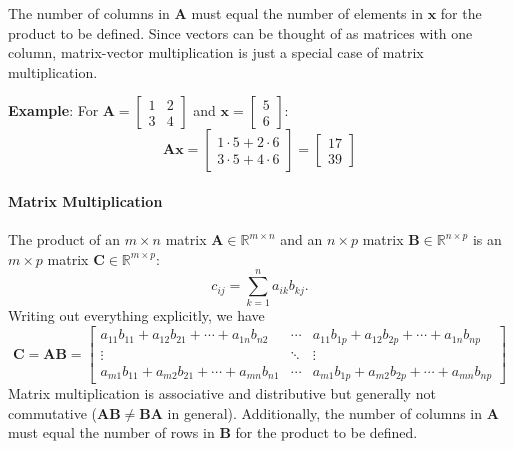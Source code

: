 The number of columns in $ \mathbf{A} $ must equal the number of elements in $ \mathbf{x} $ for the product to be defined. Since vectors can be thought of as matrices with one column, matrix-vector multiplication is just a special case of matrix multiplication.

\begin{exampleBox}
  \textbf{Example}: For $ \mathbf{A} = \begin{bmatrix}1 & 2\\3 & 4\end{bmatrix} $ and $ \mathbf{x} = \begin{bmatrix}5 \\ 6\end{bmatrix} $:
  \begin{equation*}
    \mathbf{A}\mathbf{x} = \begin{bmatrix}1 \cdot 5 + 2 \cdot 6 \\ 3 \cdot 5 + 4 \cdot 6\end{bmatrix} = \begin{bmatrix}17 \\ 39\end{bmatrix}
  \end{equation*}
\end{exampleBox}


\paragraph*{Matrix Multiplication}
The product of an $ m \times n $ matrix $ \mathbf{A}\in\mathbb{R}^{m\times n} $ and an $ n \times p $ matrix $ \mathbf{B} \in\mathbb{R}^{n\times p}$ is an $ m \times p $ matrix $ \mathbf{C} \in\mathbb{R}^{m\times p}$:
\begin{equation*}
  c_{ij} = \sum_{k=1}^n a_{ik} b_{kj}.
\end{equation*}
Writing out everything explicitly, we have
\begin{equation*}
  \mathbf{C} = \mathbf{A}\mathbf{B} = \begin{bmatrix}
    a_{11}b_{11} + a_{12}b_{21} +  \cdots + a_{1n}b_{n2} & \cdots & a_{11}b_{1p} + a_{12}b_{2p} + \cdots + a_{1n}b_{np} \\
    \vdots & \ddots & \vdots \\
    a_{m1}b_{11} + a_{m2}b_{21} + \cdots + a_{mn}b_{n1} & \cdots & a_{m1}b_{1p} + a_{m2}b_{2p} + \cdots + a_{mn}b_{np}
  \end{bmatrix}
\end{equation*}
Matrix multiplication is associative and distributive but generally not commutative ($ \mathbf{A}\mathbf{B} \neq \mathbf{B}\mathbf{A} $ in general). Additionally, the number of columns in $ \mathbf{A} $ must equal the number of rows in $ \mathbf{B} $ for the product to be defined.

